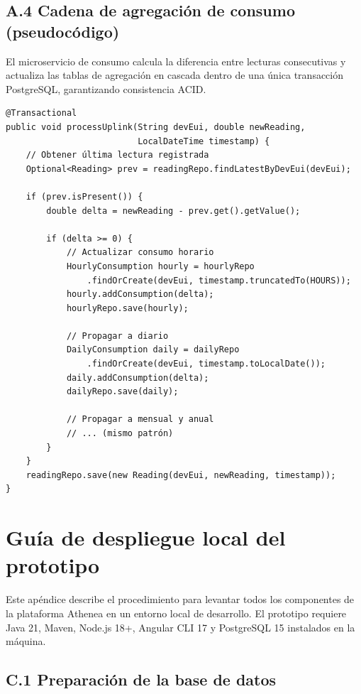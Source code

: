 \documentclass[12pt,a4paper,oneside]{report}
\begin{document}
\section*{A.4 Cadena de agregación de consumo (pseudocódigo)}

El microservicio de consumo calcula la diferencia entre lecturas consecutivas y actualiza las tablas de agregación en cascada dentro de una única transacción PostgreSQL, garantizando consistencia ACID.

\begin{verbatim}
@Transactional
public void processUplink(String devEui, double newReading,
                          LocalDateTime timestamp) {
    // Obtener última lectura registrada
    Optional<Reading> prev = readingRepo.findLatestByDevEui(devEui);

    if (prev.isPresent()) {
        double delta = newReading - prev.get().getValue();

        if (delta >= 0) {
            // Actualizar consumo horario
            HourlyConsumption hourly = hourlyRepo
                .findOrCreate(devEui, timestamp.truncatedTo(HOURS));
            hourly.addConsumption(delta);
            hourlyRepo.save(hourly);

            // Propagar a diario
            DailyConsumption daily = dailyRepo
                .findOrCreate(devEui, timestamp.toLocalDate());
            daily.addConsumption(delta);
            dailyRepo.save(daily);

            // Propagar a mensual y anual
            // ... (mismo patrón)
        }
    }
    readingRepo.save(new Reading(devEui, newReading, timestamp));
}
\end{verbatim}

\chapter{Guía de despliegue local del prototipo}
\label{apendice:despliegue}

Este apéndice describe el procedimiento para levantar todos los componentes de la plataforma Athenea en un entorno local de desarrollo. El prototipo requiere Java 21, Maven, Node.js 18+, Angular CLI 17 y PostgreSQL 15 instalados en la máquina.

\section*{C.1 Preparación de la base de datos}
\end{document}

